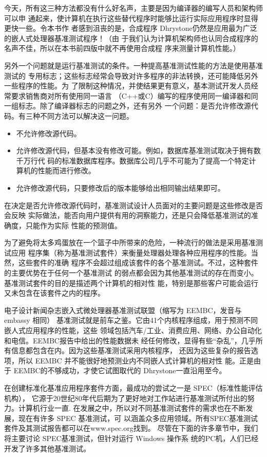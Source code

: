 今天，所有这三种方法都没有什么好名声，主要是因为编译器的编写人员和架构师可以申
通起来，使计算机在执行这些替代程序时能够比运行实际应用程序时显得更快一些。令本书作
者感到沮丧的是，合成程序 Dhrystone仍然是应用最为广泛的嵌人式处理器基准测试程序！（由
于我们认为计算机架构师也认同合成程序的名声不佳，所以在本书前四版中就不再使用合成程
序来测量计算机性能。）

另外一个问题就是运行基准测试的条件。一种提高基准测试性能的方法是使用基准测试的
专用标志；这些标志经常会导致对许多程序的非法转换，还可能降低另外一些程序的性能。为
了限制这种情况，并使结果更有意义，基本测试开发人员经常要求销售商对所有使用同一语言
（C++或C）编写的程序使用同一编译器和同一组标志。除了编译器标志的问题之外，还有另外
一个问题：是否允许修改源代码。有三种不同方法可以解决这一问题。

\begin{itemize}
    \item 不允许修改源代码。
    \item 允许修改源代码，但基本没有修改可能。例如，数据库基准测试取决于拥有数千万行代
    码的标准数据库程序。数据库公司几乎不可能为了提高一个特定计算机的性能而进行修改。
    \item 允许修改源代码，只要修改后的版本能够给出相同输出结果即可。
\end{itemize}

在决定是否允许修改源代码时，基准测试设计人员面对的主要问题是这些修改是否会反映
实际做法，能否向用户提供有用的洞察能力，还是只会降低基准测试的准确度，只能作为实际
性能的预测值。

为了避免将太多鸡蛋放在一个篮子中所带来的危险，一种流行的做法是采用基准测试应用
程序集（称为基准测试套件）来衡量处理器处理各种应用程序的性能。当然，这些套件的准确
程序不会超过组成该套件的各个基准测试。不过，这种套件的主要优势在于任何一个基准测试
的弱点都会因为其他基准测试的存在而变小。基准测试套件的目的是描述两个计算机的相对性
能，特别是那些客户可能会运行又未包含在该套件之内的程序。

电子设计新闻杂志嵌入式微处理器基准测试联盟（缩写为 EEMBC，发音与 embassy 相同）
基准测试就是前车之鉴。它由41个内核程序组成，用于预测不同嵌人式应用程序的性能，这些
领域包括汽车/工业、消费应用、网络、办公自动化和电信。EEMBC报告中给出的性能数据未
经任何修改，显得有些“杂乱”，几乎所有信息都包含在内。因为这些基准测试采用内核程序，
还因为这些复杂的报告选项，所以 EEMBC 并不能很好地预测业内不同嵌人式计算机的相对性
能。正是由于 EEMBC的不够成功，才使它试图取代的 Dhrystone一直沿用至今。

在创建标准化基准应用程序套件方面，最成功的尝试之一是 SPEC（标准性能评估机构），
它源于20世纪80年代后期为了更好地对工作站进行基准测试所付出的努力。计算机行业一直.
在发展之中，所以对不同基准测试套件的需求也在不断发展，现在有许多 SPEC 基准测试，可
以涵盖众多应用领域。所有SPEC基准测试套件及其测试报告都可以在www.spec.org找到。
尽管在下面的许多章节中，我们将主要讨论 SPEC基准测试，但针对运行 Windows 操作系
统的PC机，人们已经开发了许多其他基准测试。

